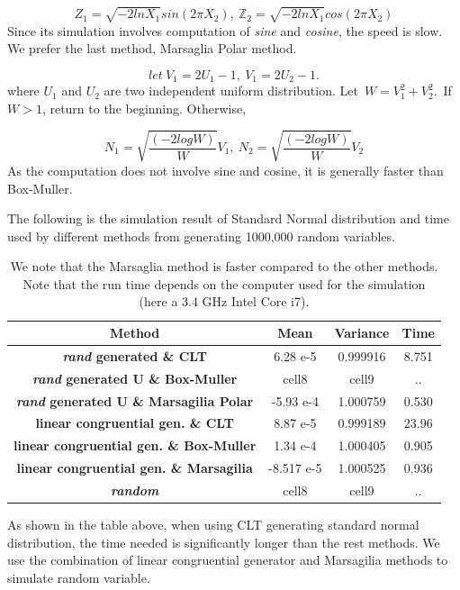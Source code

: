 \documentclass[11pt,a4paper,fleqn,draft]{article}
\newcommand\Z{\mathbb Z}
\begin{document}
$$Z_1 = \sqrt{-2lnX_1}sin(2\pi X_2),\  \Z_2=\sqrt{-2lnX_1}cos(2\pi X_2)$$Since its simulation involves computation of \textit{sine} and \textit{cosine}, the speed is slow.
We prefer the last method, Marsaglia Polar method.

$$ let \ V_1 = 2U_1-1,\  V_1 = 2U_2-1.$$
where $U_1$ and $U_2$ are two independent uniform distribution.
 Let\ $W = V_1^2+V_2^2.$\ If $W>1$, return to the beginning. Otherwise,

$$N_1 = \sqrt{\frac{(-2logW)}{W}}V_1,\ N_2 = \sqrt{\frac{(-2logW)}{W}}V_2$$As the computation does not involve sine and cosine, it is generally faster than Box-Muller.

The following is the simulation result of Standard Normal distribution and time used by different methods from generating 1000,000 random variables.

\begin{table}
\centering
\begin{tabular}{| c| c| c| c| }
\hline
\textbf{ Method} &\textbf{ Mean} & \textbf{Variance}&\textbf{ Time} \\ \hline
\textbf{\textit{ rand} generated \& CLT} & 6.28 e-5 & 0.999916 & 8.751 \\  \hline
\textbf{\textit{ rand} generated U \& Box-Muller} & cell8 & cell9&..\\ \hline
\textbf{\textit{ rand} generated U \& Marsagilia Polar} & -5.93 e-4& 1.000759& 0.530\\ \hline
\textbf{ linear congruential gen. \& CLT} & 8.87 e-5& 0.999189&23.96\\ \hline
\textbf{linear congruential gen. \& Box-Muller} & 1.34 e-4 & 1.000405&0.905\\ \hline
\textbf{ linear congruential gen. \& Marsagilia} & -8.517 e-5 & 1.000525&0.936\\ \hline
\textbf{\textit{random} }& cell8 & cell9&..\\ \hline
\end{tabular}
\caption{We note that the Marsaglia method is faster compared to the other methods. Note that the run time depends on the computer used for the simulation (here a 3.4 GHz Intel Core i7).}
\end{table}

As shown in the table above, when using CLT generating standard normal distribution, the time needed is significantly longer than the rest methods. We use the combination of linear congruential generator and Marsagilia methods to simulate random variable.
\end{document}
